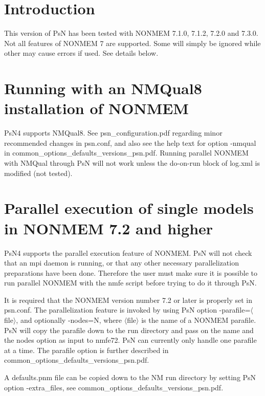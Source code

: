 


\maketitle


\section{Introduction}
This version of PsN has been tested with NONMEM 7.1.0, 7.1.2, 7.2.0 and 7.3.0. Not all features of NONMEM 7 are supported. Some will simply be ignored while other may cause errors if used. See details below.

\section{Running with an NMQual8 installation of NONMEM}
PsN4 supports NMQual8. See psn\_configuration.pdf regarding minor recommended changes in psn.conf, and also see
the help text for option -nmqual in common\_options\_defaults\_versions\_psn.pdf.
Running parallel NONMEM with NMQual through PsN will not work unless the do-on-run block of log.xml is modified
(not tested).

\section{Parallel execution of single models in NONMEM 7.2 and higher}
PsN4 supports the parallel execution feature of NONMEM. PsN will not check that an mpi daemon is running, or that any other necessary parallelization preparations have been done. Therefore the user must make sure it is possible to run parallel NONMEM with the nmfe script before trying to do it through PsN.

It is required that the NONMEM version number 7.2 or later is properly set in psn.conf. 
The parallelization feature is invoked by using PsN option -parafile=$\langle$file$\rangle$, and optionally -nodes=N, where $\langle$file$\rangle$ is the name of a NONMEM parafile. PsN will copy the parafile down to the run directory and pass on the name and the nodes option as input to nmfe72. PsN can currently only handle one parafile at a time. The parafile option is further described in common\_options\_defaults\_versions\_psn.pdf.

A defaults.pnm file can be copied down to the NM run directory by setting PsN option -extra\_files, see common\_options\_defaults\_versions\_psn.pdf.


